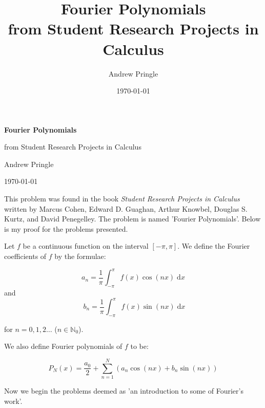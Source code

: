\documentclass[12pt]{article}
\title{Fourier Polynomials \\ \small from Student Research Projects in Calculus}
\author{Andrew Pringle}
\date{\today}
\begin{document}
\begin{titlepage}
    \centering

    \vspace*{1in}

    {\Huge\bfseries Fourier Polynomials\par}

    \vspace{0.4in}

    {\Large from Student Research Projects in Calculus\par}

    \vspace{1.5in}

    {\LARGE Andrew Pringle\par}

    \vspace{0.5in}

    {\Large \today\par}

    \vspace*{\fill}

\end{titlepage}
This problem was found in the book \textit{Student Research Projects in Calculus} written by Marcus Cohen, Edward D. Guaghan, Arthur Knowbel, Douglas S. Kurtz, and David Penegelley. The problem is named 'Fourier Polynomials'. Below is my proof for the problems presented.

\vspace{.1in}

Let $f$ be a continuous function on the interval $[-\pi,\pi]$. We define the Fourier coefficients of $f$ by the formulae:


\[a_n = \frac{1}{\pi}\int_{-\pi}^{\pi} f(x)\cos(nx) \;\mathrm{d}x\] 
and 
\[ \; b_n = \frac{1}{\pi}\int_{-\pi}^{\pi} f(x)\sin(nx)\; \mathrm{d}x\]

for $n = 0, 1, 2 \dots$ ($n \in \mathbb{N}_0$).

\vspace{.1in}

We also define Fourier polynomials of $f$ to be:

\[P_N(x) = \frac{a_0}{2} + \sum_{n=1}^{N}\left(a_n\cos(nx) + b_n\sin(nx)\right)\]

\vspace{.1in}

Now we begin the problems deemed as 'an introduction to some of Fourier's work'.

\vspace{.1in}
\end{document}
